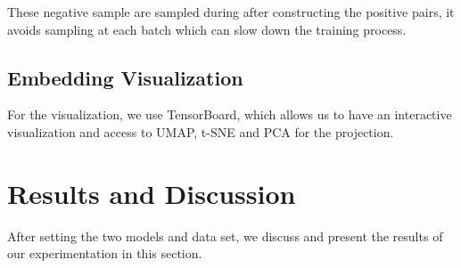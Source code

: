    These negative sample are sampled during after constructing the positive pairs, it avoids sampling at each batch which can slow down the training process.
   \subsection{Embedding Visualization}
   For the visualization, we use TensorBoard, which allows us to have an interactive visualization and access to UMAP, t-SNE and PCA for the projection.

   \section{Results and Discussion}\label{sec4}
   After setting the two models and data set, we discuss and present the results of our experimentation in this section.
